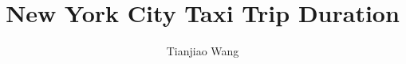\documentclass{tikzposter} %
\title{New York City Taxi Trip Duration}
\author{Tianjiao Wang}
\institute{Beijing Technology and Business University
}
\providecommand{\DIFdelbegin}{} %
\newcommand{\DIFscaledelfig}{0.5}
\newlength{\DIFdelgraphicswidth} %
\newlength{\DIFdelgraphicsheight} %
\newcommand{\DIFdelincludegraphics}[2][]{%
\sbox{\DIFdelgraphicsbox}{\DIFOincludegraphics[#1]{#2}}%
\settoboxwidth{\DIFdelgraphicswidth}{\DIFdelgraphicsbox} %
\settoboxtotalheight{\DIFdelgraphicsheight}{\DIFdelgraphicsbox} %
\scalebox{\DIFscaledelfig}{%
\parbox[b]{\DIFdelgraphicswidth}{\usebox{\DIFdelgraphicsbox}\\[-\baselineskip] \rule{\DIFdelgraphicswidth}{0em}}\llap{\resizebox{\DIFdelgraphicswidth}{\DIFdelgraphicsheight}{%
\setlength{\unitlength}{\DIFdelgraphicswidth}%
\begin{picture}(1,1)%
\thicklines\linethickness{2pt} %
{\color[rgb]{1,0,0}\put(0,0){\framebox(1,1){}}}%
{\color[rgb]{1,0,0}\put(0,0){\line( 1,1){1}}}%
{\color[rgb]{1,0,0}\put(0,1){\line(1,-1){1}}}%
\end{picture}%
}\hspace*{3pt}}} %
} %
\DeclareRobustCommand{\DIFdelbegin}{\DIFOdelbegin \let\includegraphics\DIFdelincludegraphics} %
\begin{document}

\maketitle

\begin{columns}



\DIFdelbegin %

\begin{description}%



\end{description}
\end{columns}
\end{document}

